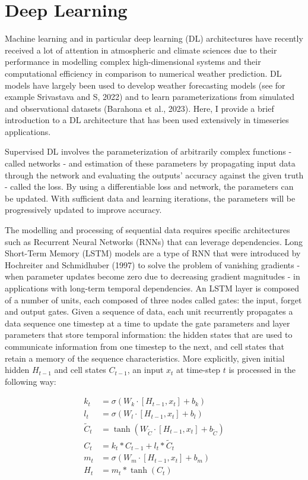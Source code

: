 \documentclass[11pt,a4paper,twoside,openright]{report}
\theoremstyle{definition}
\begin{document}
\section{Deep Learning}\label{deep-learning}

Machine learning and in particular deep learning (DL) architectures have recently received a lot of attention in atmospheric and climate sciences due to their performance in modelling complex high-dimensional systems and their computational efficiency in comparison to numerical weather prediction. DL models have largely been used to develop weather forecasting models (see for example Srivastava and S, 2022) and to learn parameterizations from simulated and observational datasets (Barahona et al., 2023). Here, I provide a brief introduction to a DL architecture that has been used extensively in timeseries applications.

Supervised DL involves the parameterization of arbitrarily complex functions - called networks - and estimation of these parameters by propagating input data through the network and evaluating the outputs' accuracy against the given truth - called the loss. By using a differentiable loss and network, the parameters can be updated. With sufficient data and learning iterations, the parameters will be progressively updated to improve accuracy.

The modelling and processing of sequential data requires specific architectures such as Recurrent Neural Networks (RNNs) that can leverage dependencies. Long Short-Term Memory (LSTM) models are a type of RNN that were introduced by Hochreiter and Schmidhuber (1997) to solve the problem of vanishing gradients - when parameter updates become zero due to decreasing gradient magnitudes - in applications with long-term temporal dependencies. An LSTM layer is composed of a number of units, each composed of three nodes called gates: the input, forget and output gates. Given a sequence of data, each unit recurrently propagates a data sequence one timestep at a time to update the gate parameters and layer parameters that store temporal information: the hidden states that are used to communicate information from one timestep to the next, and cell states that retain a memory of the sequence characteristics. More explicitly, given initial hidden \(H_{t-1}\) and cell states \(C_{t-1}\), an input \(x_t\) at time-step \(t\) is processed in the following way:

\begin{equation}
  \begin{aligned}
    k_t &= \sigma \left( W_k \cdot [H_{t-1}, x_t] + b_k \right) \\
    l_t &= \sigma \left( W_l \cdot [H_{t-1}, x_t] + b_l\right) \\
    \tilde{C}_t &= \tanh \left( W_{\tilde{C}} \cdot [ H_{t-1}, x_t ] + b_{\tilde{C}}\right) \\
    C_t &= k_t \ast C_{t-1} + l_{t} \ast \tilde{C}_t \\
    m_t &= \sigma \left( W_m \cdot [H_{t-1}, x_t] + b_m\right) \\
    H_t &= m_t \ast \tanh (C_t)
  \end{aligned}
\label{eq:lstm}
\end{equation}
\end{document}
